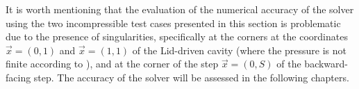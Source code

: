 It is worth mentioning that the evaluation of the numerical accuracy of the solver using the two incompressible test cases presented in this section is problematic due to the presence of singularities, specifically at the corners at the coordinates $ \vec{x} = (0,1)$ and $\vec{x} =(1,1)$ of the Lid-driven cavity (where the pressure is not finite according to \cite{botellaBenchmarkSpectralResults1998}), and at the corner of the step $\vec{x} = (0,S)$ of the backward-facing step. The accuracy of the solver will be assessed in the following chapters.
